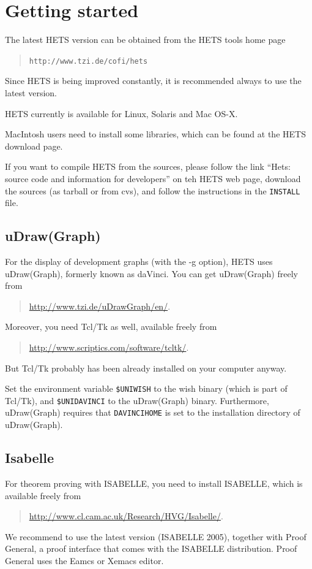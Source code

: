 \documentclass{article}
\newcommand{\normalTEXTSC}[2]{{#1\scriptsize#2}}
\newcommand     {\Hets}{\normalTEXTSC{H}{ETS}\xspace}
\newcommand     {\Isabelle}{\normalTEXTSC{I}{SABELLE}\xspace}
\begin{document}
\section{Getting started}
 
The latest \Hets version can be obtained from the
\Hets tools home page
\begin{quote}
\texttt{http://www.tzi.de/cofi/hets}
\end{quote}
 Since \Hets is being
improved constantly, it is recommended always to use the latest version.

\Hets currently is available for Linux, Solaris and
Mac OS-X. 

MacIntosh users need to install some libraries, which can be found
at the \Hets download page.

If you want to compile \Hets from the sources, please follow the
link ``Hets: source code and information for developers''
on teh \Hets web page, download the sources (as tarball or from
cvs), and follow the
instructions in the \texttt{INSTALL} file.

\subsection*{uDraw(Graph)}
For the display of development graphs (with the -g option), \Hets uses
uDraw(Graph), formerly known as daVinci.
You can get uDraw(Graph) freely from 
\begin{quote}
\url{http://www.tzi.de/uDrawGraph/en/}.
\end{quote}
Moreover, you need Tcl/Tk as well, available freely from
\begin{quote}
\url{http://www.scriptics.com/software/tcltk/}.
\end{quote}
But Tcl/Tk probably has been already installed
on your computer anyway.

Set the environment variable \texttt{\$UNIWISH} to the wish binary
(which is part of Tcl/Tk), and \texttt{\$UNIDAVINCI} to the
uDraw(Graph) binary. Furthermore, uDraw(Graph) requires that
\texttt{DAVINCIHOME} is set to the installation directory of
uDraw(Graph).

\subsection*{Isabelle}

For theorem proving with \Isabelle, you need to install \Isabelle,
which is available freely from 
\begin{quote}
\url{http://www.cl.cam.ac.uk/Research/HVG/Isabelle/}.
\end{quote}
We recommend to use the latest version (\Isabelle 2005), together
with Proof General, a proof interface that comes with the \Isabelle
distribution. Proof General uses the Eamcs or Xemacs editor.
\end{document}
